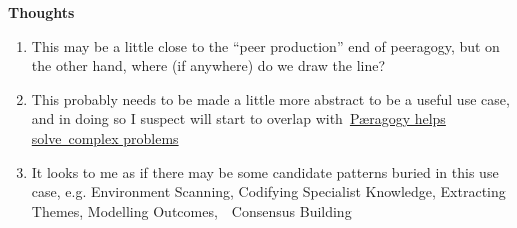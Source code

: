 \textbf{Thoughts}

\begin{enumerate}
\item
  This may be a little close to the ``peer production'' end of
  peeragogy, but on the other hand, where (if anywhere) do we draw the
  line?
\item
  This probably needs to be made a little more abstract to be a useful
  use case, and in doing so I suspect will start to overlap
  with~\href{http://socialmediaclassroom.com/host/peeragogy/forum/patterns-and-use-cases\#comment-1509}{Pæragogy
  helps solve~complex problems}
\item
  It looks to me as if there may be some candidate patterns buried in
  this use case, e.g. Environment Scanning, Codifying Specialist
  Knowledge, Extracting Themes, Modelling Outcomes,~~Consensus Building
\end{enumerate}
